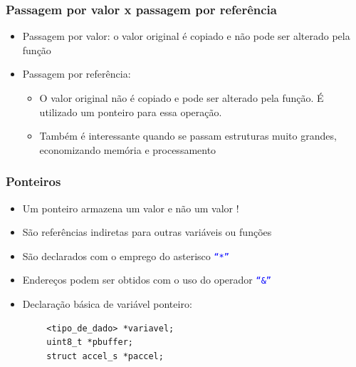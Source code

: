\documentclass{beamer}
\begin{document}
\begin{frame}
\end{frame}

\begin{frame}
	\frametitle{Passagem por valor x passagem por referência}
	\begin{itemize}
		\item Passagem por valor: o valor original é copiado e não pode ser alterado pela função
		\item Passagem por referência: 
		\begin{itemize}
			\item O valor original não é copiado e pode ser alterado pela função. É utilizado um ponteiro para essa operação.
			\item Também é interessante quando se passam estruturas muito grandes, economizando memória e processamento
		\end{itemize}
	\end{itemize}
\end{frame}

\begin{frame}[fragile]
	\frametitle{Ponteiros}
	\begin{itemize}
		\item Um ponteiro armazena um valor e não um valor !
		\item São referências indiretas para outras variáveis ou funções
		\item São declarados com o emprego do asterisco \texttt{\textcolor{blue}{``*''}}
		\item Endereços podem ser obtidos com o uso do operador \texttt{\textcolor{blue}{``\&''}}
		\item Declaração básica de variável ponteiro:
	\end{itemize}
	\begin{verbatim}
        <tipo_de_dado> *variavel;
        uint8_t *pbuffer;
        struct accel_s *paccel;
	\end{verbatim}	
\end{frame}
\end{document}

